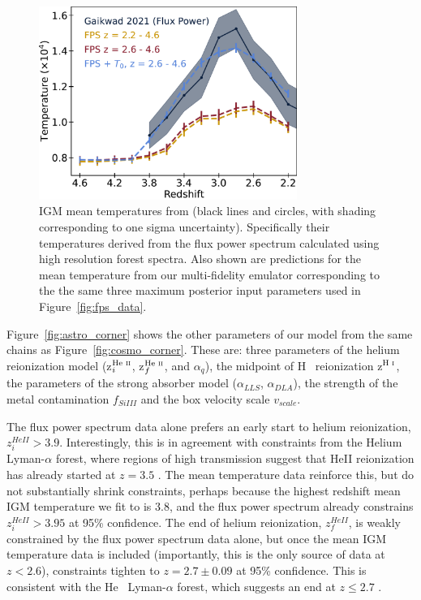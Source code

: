 \begin{figure}
    \centering
    \includegraphics[width=0.75\textwidth]{figures/t0_best_fit.pdf}
    \caption{\label{fig:temp_data}
    IGM mean temperatures from \protect\cite{2021MNRAS.506.4389G} (black lines and circles, with shading corresponding to one sigma uncertainty).
    Specifically their temperatures derived from the flux power spectrum calculated using high resolution \lya forest spectra.
    Also shown are predictions for the mean temperature from our multi-fidelity emulator corresponding to the the same three maximum posterior input parameters used in Figure~\protect\ref{fig:fps_data}.
    }
\end{figure}

Figure~\ref{fig:astro_corner} shows the other parameters of our model from the same chains as Figure~\ref{fig:cosmo_corner}. These are: three parameters of the helium reionization model (z$^{\text{He~{\sc ii}}}_i$, z$^{\text{He~{\sc ii}}}_f$, and $\alpha_q$), the midpoint of H~{} reionization z$^{\text{H~{\sc i}}}$, the parameters of the strong absorber model ($\alpha_{LLS}$, $\alpha_{DLA}$), the strength of the metal contamination $f_{SiIII}$ and the box velocity scale $v_{scale}$.

The flux power spectrum data alone prefers an early start to helium reionization, $z_i^{HeII} > 3.9$. Interestingly, this is in agreement with constraints from the Helium Lyman-$\alpha$ forest, where regions of high transmission suggest that HeII reionization has already started at $z = 3.5$ \cite{2016ApJ...825..144W, 2021ApJ...912...38M}. The mean temperature data reinforce this, but do not substantially shrink constraints, perhaps because the highest redshift mean IGM temperature we fit to is $3.8$, and the flux power spectrum already constrains $z_i^{HeII} > 3.95$ at 95\% confidence. The end of helium reionization, $z_f^{HeII}$, is weakly constrained by the flux power spectrum data alone, but once the mean IGM temperature data is included (importantly, this is the only source of data at $z < 2.6$), constraints tighten to $z=2.7 \pm 0.09$ at 95\% confidence. This is consistent with the He~{} Lyman-$\alpha$ forest, which suggests an end at $z \leq 2.7$ \cite{2009ApJ...704L..89M, 2011ApJ...733L..24W, 2019ApJ...875..111W}.

